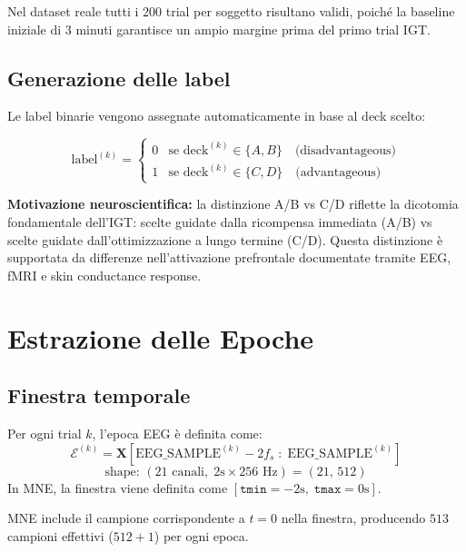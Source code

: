\documentclass[12pt, a4paper]{article}
\begin{document}
Nel dataset reale tutti i 200 trial per soggetto risultano validi, poiché la baseline iniziale di 3 minuti garantisce un ampio margine prima del primo trial IGT.

\subsection{Generazione delle label}

Le label binarie vengono assegnate automaticamente in base al deck scelto:

\begin{formulabox}
\[
\text{label}^{(k)} = \begin{cases}
0 & \text{se } \text{deck}^{(k)} \in \{A, B\} \quad\text{(disadvantageous)}\\
1 & \text{se } \text{deck}^{(k)} \in \{C, D\} \quad\text{(advantageous)}
\end{cases}
\]
\end{formulabox}

\textbf{Motivazione neuroscientifica:} la distinzione A/B vs C/D riflette la dicotomia fondamentale dell'IGT: scelte guidate dalla ricompensa immediata (A/B) vs scelte guidate dall'ottimizzazione a lungo termine (C/D). Questa distinzione è supportata da differenze nell'attivazione prefrontale documentate tramite EEG, fMRI e skin conductance response.

\section{Estrazione delle Epoche}

\subsection{Finestra temporale}

\begin{formulabox}
Per ogni trial $k$, l'epoca EEG è definita come:
\[
\mathcal{E}^{(k)} = \mathbf{X}\left[\text{EEG\_SAMPLE}^{(k)} - 2f_s \;:\; \text{EEG\_SAMPLE}^{(k)}\right]
\]
\[
\text{shape: } (21\text{ canali},\; 2\text{s} \times 256\text{ Hz}) = (21,\, 512)
\]
In MNE, la finestra viene definita come $[\texttt{tmin}=-2\text{s},\; \texttt{tmax}=0\text{s}]$.
\end{formulabox}

MNE include il campione corrispondente a $t=0$ nella finestra, producendo $513$ campioni effettivi ($512 + 1$) per ogni epoca.
\end{document}
